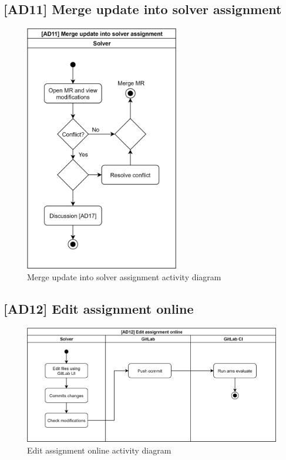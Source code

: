 \subsection{{[}AD11{]} Merge update into solver assignment} \label{ssec:ad11}

\begin{figure}[H]
    \centering
    \includegraphics[width=0.6\textwidth,height=\textheight,keepaspectratio]{Figures/ad/ad9.png}
    \caption{Merge update into solver assignment activity diagram}
\end{figure}

\subsection{{[}AD12{]} Edit assignment online} \label{ssec:ad12}

\begin{figure}[H]
    \centering
    \includegraphics[width=\textwidth,height=\textheight,keepaspectratio]{Figures/ad/ad15.png}
    \caption{Edit assignment online activity diagram}
\end{figure}

